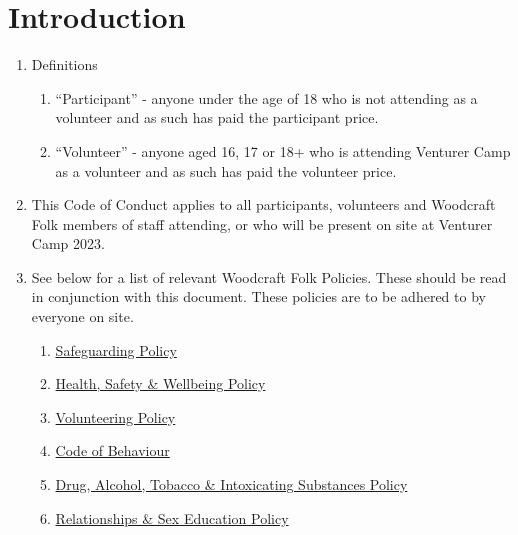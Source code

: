 \documentclass[a4paper, 11pt]{report}
\begin{document}
    \tableofcontents
    \chapter{Introduction}
    \begin{enumerate}
        \item Definitions
        \begin{enumerate}
            \item ``Participant'' - anyone under the age of 18 who is not attending as a volunteer and as such has paid the participant price.
            \item ``Volunteer'' - anyone aged 16, 17 or 18+ who is attending Venturer Camp as a volunteer and as such has paid the volunteer price.
        \end{enumerate}
        \item This Code of Conduct applies to all participants, volunteers and Woodcraft Folk members of staff attending, or who will be present on site at Venturer Camp 2023.
        \item See below for a list of relevant Woodcraft Folk Policies. These should be read in conjunction with this document. These policies are to be adhered to by everyone on site.
        \begin{enumerate}
            \item \href{https://woodcraft.org.uk/resources/safeguarding-policy/}{Safeguarding Policy}
            \item \href{https://woodcraft.org.uk/resources/health-safety-policy/}{Health, Safety \& Wellbeing Policy}
            \item \href{https://woodcraft.org.uk/resources/volunteering-policy/}{Volunteering Policy}
            \item \href{https://woodcraft.org.uk/resources/code-of-behaviour/}{Code of Behaviour}
            \item \href{https://woodcraft.org.uk/resources/drug-alcohol-policy/}{Drug, Alcohol, Tobacco \& Intoxicating Substances Policy}
            \item \href{https://woodcraft.org.uk/resources/relationship-sex-education-policy/}{Relationships \& Sex Education Policy}
        \end{enumerate}
    \end{enumerate}
\end{document}
